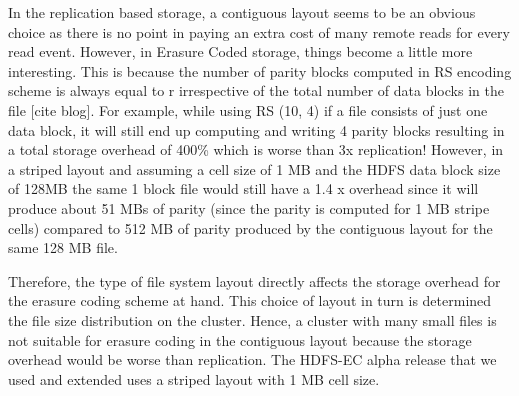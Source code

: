 \documentclass{sig-alternate-05-2015}
\begin{document}
In the replication based storage, a contiguous layout seems to be an obvious choice as there is no point in paying an extra cost of many remote reads for every read event. However, in Erasure Coded storage, things become a little more interesting. This is because the number of parity blocks computed in RS encoding scheme is always equal to r irrespective of the total number of data blocks in the file [cite blog]. For example, while using RS (10, 4) if a file consists of just one data block, it will still end up computing and writing 4 parity blocks resulting in a total storage overhead of 400\% which is worse than 3x replication! However, in a striped layout and assuming a cell size of 1 MB and the HDFS data block size of 128MB the same 1 block file would still have a 1.4 x overhead since it will produce about 51 MBs of parity (since the parity is computed for 1 MB stripe cells) compared to 512 MB of parity produced by the contiguous layout for the same 128 MB file. 

Therefore, the type of file system layout directly affects the storage overhead for the erasure coding scheme at hand. This choice of layout in turn is determined the file size distribution on the cluster. Hence, a cluster with many small files is not suitable for erasure coding in the contiguous layout because the storage overhead would be worse than replication. The HDFS-EC alpha release that we used and extended uses a striped layout with 1 MB cell size. 
\end{document}
